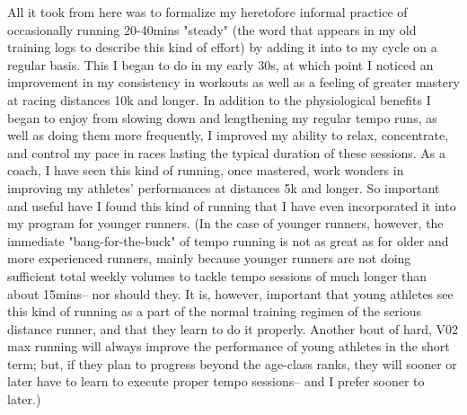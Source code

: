 All it took from here was to formalize my heretofore informal practice of occasionally running 20-40mins "steady" (the word that appears in my old training logs to describe this kind of effort) by adding it into to my cycle on a regular basis. This I began to do in my early 30s, at which point I noticed an improvement in my consistency in workouts as well as a feeling of greater mastery at racing distances 10k and longer. In addition to the physiological benefits I began to enjoy from slowing down and lengthening my regular tempo runs, as well as doing them more frequently, I improved my ability to relax, concentrate, and control my pace in races lasting the typical duration of these sessions. As a coach, I have seen this kind of running, once mastered, work wonders in improving my athletes' performances at distances 5k and longer. So important and useful have I found this kind of running that I have even incorporated it into my program for younger runners. (In the case of younger runners, however, the immediate "bang-for-the-buck" of tempo running is not as great as for older and more experienced runners, mainly because younger runners are not doing sufficient total weekly volumes to tackle tempo sessions of much longer than about 15mins-- nor should they. It is, however, important that young athletes see this kind of running as a part of the normal training regimen of the serious distance runner, and that they learn to do it properly. Another bout of hard, V02 max running will always improve the performance of young athletes in the short term; but, if they plan to progress beyond the age-class ranks, they will sooner or later have to learn to execute proper tempo sessions-- and I prefer sooner to later.)

